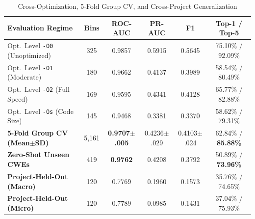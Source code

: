 \documentclass[10pt,conference]{IEEEtran}
\begin{document}
\begin{table}[!t]
\caption{Cross-Optimization, 5-Fold Group CV, and Cross-Project Generalization}
\label{tab:generalization}
\renewcommand{\arraystretch}{1.0}
\footnotesize
\setlength\tabcolsep{2.2pt}
\begin{tabular}{lccccc}
\toprule
\textbf{Evaluation Regime} & \textbf{Bins} & \textbf{ROC-AUC} & \textbf{PR-AUC} & \textbf{F1} & \textbf{Top-1 / Top-5} \\
\midrule
Opt.\ Level \texttt{-O0} (Unoptimized) & 325 & 0.9857 & 0.5915 & 0.5645 & 75.10\% / 92.09\% \\
Opt.\ Level \texttt{-O1} (Moderate)    & 180 & 0.9662 & 0.4137 & 0.3989 & 58.54\% / 80.49\% \\
Opt.\ Level \texttt{-O2} (Full Speed)  & 169 & 0.9595 & 0.4341 & 0.4128 & 65.77\% / 82.88\% \\
Opt.\ Level \texttt{-Os} (Code Size)   & 145 & 0.9468 & 0.3381 & 0.3370 & 58.62\% / 79.31\% \\
\midrule
\textbf{5-Fold Group CV (Mean$\pm$SD)} & 5{,}161 & \textbf{0.9707$\pm$.005} & 0.4236$\pm$.029 & 0.4103$\pm$.024 & 62.84\% / \textbf{85.88\%} \\
\textbf{Zero-Shot Unseen CWEs}         & 419 & \textbf{0.9762} & 0.4208 & 0.3792 & 50.89\% / \textbf{73.96\%} \\
\textbf{Project-Held-Out (Macro)}      & 120 & 0.7769 & 0.1960 & 0.1573 & 35.76\% / 74.65\% \\
\textbf{Project-Held-Out (Micro)}      & 120 & 0.7789 & 0.0985 & 0.1431 & 37.04\% / 75.93\% \\
\bottomrule
\end{tabular}
\end{table}
\end{document}
